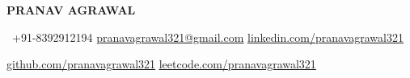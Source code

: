 \begin{center}
    \textbf{\Huge \scshape PRANAV AGRAWAL} \\ \vspace{1pt}
\end{center}

\begin{center}        
     \ \small +91-8392912194 \quad
    \href{mailto:pranavagrawal321@gmail.com}{ \underline{pranavagrawal321@gmail.com}} \quad
    \href{https://www.linkedin.com/in/pranavagrawal321}{ \underline{linkedin.com/pranavagrawal321}} \quad


    \href{https://github.com/pranavagrawal321}{ \underline{github.com/pranavagrawal321}} \quad
    \href{https://leetcode.com/pranavagrawal321}{ \underline{leetcode.com/pranavagrawal321}} \quad
\end{center}